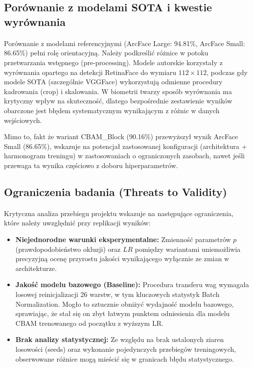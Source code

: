 \subsection{Porównanie z modelami SOTA i kwestie wyrównania}
\paragraph{}Porównanie z modelami referencyjnymi (ArcFace Large: 94.81\%, ArcFace Small: 86.65\%) pełni rolę orientacyjną. Należy podkreślić różnice w potoku przetwarzania wstępnego (pre-processing). Modele autorskie korzystały z wyrównania opartego na detekcji RetinaFace do wymiaru $112\times112$, podczas gdy modele SOTA (szczególnie VGGFace) wykorzystują odmienne procedury kadrowania (crop) i skalowania. W biometrii twarzy sposób wyrównania ma krytyczny wpływ na skuteczność, dlatego bezpośrednie zestawienie wyników obarczone jest błędem systematycznym wynikającym z różnic w danych wejściowych.

Mimo to, fakt że wariant CBAM\_Block (90.16\%) przewyższył wynik ArcFace Small (86.65\%), wskazuje na potencjał zastosowanej konfiguracji (architektura + harmonogram treningu) w zastosowaniach o ograniczonych zasobach, nawet jeśli przewaga ta wynika częściowo z doboru hiperparametrów.

\subsection{Ograniczenia badania (Threats to Validity)}
\paragraph{}Krytyczna analiza przebiegu projektu wskazuje na następujące ograniczenia, które należy uwzględnić przy replikacji wyników:
\begin{itemize}
	\item \textbf{Niejednorodne warunki eksperymentalne:} Zmienność parametrów $p$ (prawdopodobieństwo okluzji) oraz $LR$ pomiędzy wariantami uniemożliwia precyzyjną ocenę przyrostu jakości wynikającego wyłącznie ze zmian w architekturze.
	\item \textbf{Jakość modelu bazowego (Baseline):} Procedura transferu wag wymagała losowej reinicjalizacji 26 warstw, w tym kluczowych statystyk Batch Normalization. Mogło to sztucznie obniżyć wydajność modelu bazowego, sprawiając, że stał się on zbyt łatwym punktem odniesienia dla modelu CBAM trenowanego od początku z wyższym LR.
	\item \textbf{Brak analizy statystycznej:} Ze względu na brak ustalonych ziaren losowości (seeds) oraz wykonanie pojedynczych przebiegów treningowych, obserwowane różnice mogą mieścić się w granicach błędu statystycznego.
\end{itemize}
